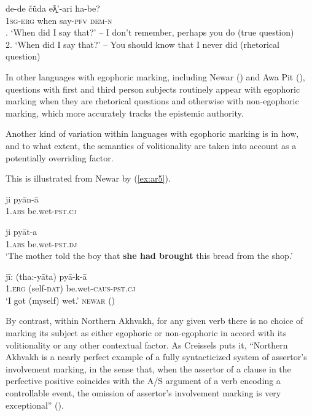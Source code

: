 \documentclass[output=paper]{langsci/langscibook}
\begin{document}
\begin{exe}
	\ex \label{ex:ar4}
	\gll de-de čũda	eƛ̱’-ari	ha-be?\\
	1\textsc{sg}-\textsc{erg}	when say-\textsc{pfv} \textsc{dem}-\textsc{n}\\
	. ‘When did I say that?’ – I don’t remember, perhaps you do (true question)\\
	2. ‘When did I say that?’ – You should know that I never did (rhetorical question) \cite[11]{Creissels2008}
\end{exe}

In other languages with egophoric marking, including Newar (\citealt[249]{HaleWatters1973}) and Awa Pit (\citealt[614-615]{Curnow2002}), questions with first and third person subjects routinely appear with egophoric marking when they are rhetorical questions and otherwise with non-egophoric marking, which more accurately tracks the epistemic authority.
 
Another kind of variation within languages with egophoric marking is in how, and to what extent, the semantics of volitionality are taken into account as a potentially overriding factor.

This is illustrated from Newar by (\ref{ex:ar5}).

\begin{exe}
	\ex \label{ex:ar5}
	\begin{xlist}
		\ex \label{ex:ar5a}
		\gll *ji pyān-ā\\
		1.\textsc{abs} be.wet-\textsc{pst}.\textsc{cj}\\
		\trans

		\ex \label{ex:ar5b}
		\gll ji pyāt-a\\
		1.\textsc{abs} be.wet-\textsc{pst}.\textsc{dj}\\
		\trans ‘The mother told the boy that \textbf{she had brought} this bread from the shop.’
		
		\ex \label{ex:ar5c}
		\gll jī: (tha:-yāta) pyā-k-ā\\
		1.\textsc{erg} (self-\textsc{dat}) be.wet-\textsc{caus}-\textsc{pst}.\textsc{cj}\\
		\trans ‘I got (myself) wet.’ \textsc{newar} (\citealt[29]{Hargreaves2005})
	\end{xlist}	
\end{exe}

By contrast, within Northern Akhvakh, for any given verb there is no choice of marking its subject as either egophoric or non-egophoric in accord with its volitionality or any other contextual factor.  As Creissels puts it, “Northern Akhvakh is a nearly perfect example of a fully syntacticized system of assertor’s involvement marking, in the sense that, when the assertor of a clause in the perfective positive coincides with the A/S argument of a verb encoding a controllable event, the omission of assertor’s involvement marking is very exceptional” (\citealt[12--13]{Creissels2008}).
\end{document}
